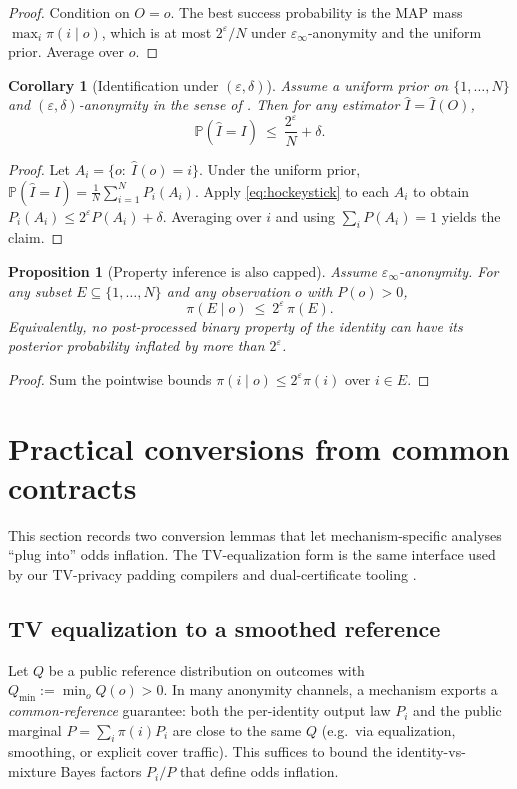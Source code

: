 \documentclass[11pt]{article}
\newcommand{\PP}{\mathbb{P}}
\newtheorem{proposition}{Proposition}
\newtheorem{corollary}{Corollary}
\theoremstyle{definition}
\theoremstyle{remark}
\begin{document}
\begin{proof}
Condition on $O=o$.
The best success probability is the MAP mass $\max_i\pi(i\mid o)$, which is at most $2^{\varepsilon}/N$ under $\varepsilon_\infty$-anonymity and the uniform prior.
Average over $o$.
\end{proof}


\begin{corollary}[Identification under $(\varepsilon,\delta)$]\label{cor:identification_epsdelta}
Assume a uniform prior on $\{1,\dots,N\}$ and $(\varepsilon,\delta)$-anonymity in the sense of .
Then for any estimator $\widehat I=\widehat I(O)$,
\[
\PP(\widehat I=I)\ \le\ \frac{2^{\varepsilon}}{N}+\delta.
\]
\end{corollary}

\begin{proof}
Let $A_i=\{o:\ \widehat I(o)=i\}$.
Under the uniform prior, $\PP(\widehat I=I)=\frac{1}{N}\sum_{i=1}^N P_i(A_i)$.
Apply \eqref{eq:hockeystick} to each $A_i$ to obtain $P_i(A_i)\le 2^\varepsilon P(A_i)+\delta$.
Averaging over $i$ and using $\sum_i P(A_i)=1$ yields the claim.
\end{proof}



\begin{proposition}[Property inference is also capped]\label{prop:property}
Assume $\varepsilon_\infty$-anonymity. For any subset $E\subseteq\{1,\dots,N\}$ and any observation $o$ with $P(o)>0$,
\[
\pi(E\mid o)\ \le\ 2^{\varepsilon}\,\pi(E).
\]
Equivalently, no post-processed binary property of the identity can have its posterior probability inflated by more than $2^{\varepsilon}$.
\end{proposition}

\begin{proof}
Sum the pointwise bounds $\pi(i\mid o)\le 2^{\varepsilon}\pi(i)$ over $i\in E$.
\end{proof}

\section{Practical conversions from common contracts}
This section records two conversion lemmas that let mechanism-specific analyses ``plug into'' odds inflation.
The TV-equalization form is the same interface used by our TV-privacy padding compilers and dual-certificate tooling \cite{series:knapsacktransport}.

\subsection{TV equalization to a smoothed reference}
Let $Q$ be a public reference distribution on outcomes with $Q_{\min}:=\min_o Q(o)>0$.
In many anonymity channels, a mechanism exports a \emph{common-reference} guarantee: both the per-identity output law $P_i$ and the public marginal $P=\sum_i \pi(i)P_i$ are close to the same $Q$ (e.g.\ via equalization, smoothing, or explicit cover traffic).
This suffices to bound the identity-vs-mixture Bayes factors $P_i/P$ that define odds inflation.
\end{document}
